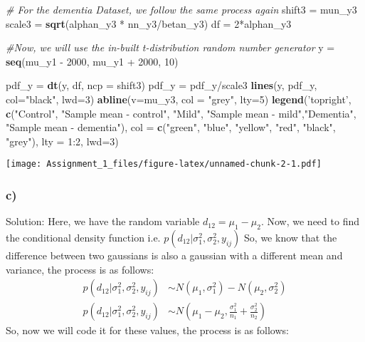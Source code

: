 \documentclass[]{article}
\newenvironment{Shaded}{\begin{snugshade}}{\end{snugshade}}
\newcommand{\KeywordTok}[1]{\textcolor[rgb]{0.13,0.29,0.53}{\textbf{{#1}}}}
\newcommand{\DataTypeTok}[1]{\textcolor[rgb]{0.13,0.29,0.53}{{#1}}}
\newcommand{\DecValTok}[1]{\textcolor[rgb]{0.00,0.00,0.81}{{#1}}}
\newcommand{\StringTok}[1]{\textcolor[rgb]{0.31,0.60,0.02}{{#1}}}
\newcommand{\CommentTok}[1]{\textcolor[rgb]{0.56,0.35,0.01}{\textit{{#1}}}}
\newcommand{\NormalTok}[1]{{#1}}
\begin{document}
\begin{Shaded}
\begin{Highlighting}[]
\CommentTok{# For the dementia Dataset, we follow the same process again}
\NormalTok{shift3 =}\StringTok{ }\NormalTok{mun_y3}
\NormalTok{scale3 =}\StringTok{ }\KeywordTok{sqrt}\NormalTok{(alphan_y3 *}\StringTok{ }\NormalTok{nn_y3/betan_y3)}
\NormalTok{df =}\StringTok{ }\DecValTok{2}\NormalTok{*alphan_y3}

\CommentTok{#Now, we will use the in-built t-distribution random number generator}
\NormalTok{y =}\StringTok{ }\KeywordTok{seq}\NormalTok{(mu_y1 -}\StringTok{ }\DecValTok{2000}\NormalTok{, mu_y1 +}\StringTok{ }\DecValTok{2000}\NormalTok{, }\DecValTok{10}\NormalTok{)}

\NormalTok{pdf_y =}\StringTok{ }\KeywordTok{dt}\NormalTok{(y, df, }\DataTypeTok{ncp =} \NormalTok{shift3)}
\NormalTok{pdf_y =}\StringTok{ }\NormalTok{pdf_y/scale3}
\KeywordTok{lines}\NormalTok{(y, pdf_y, }\DataTypeTok{col=}\StringTok{"black"}\NormalTok{, }\DataTypeTok{lwd=}\DecValTok{3}\NormalTok{)}
\KeywordTok{abline}\NormalTok{(}\DataTypeTok{v=}\NormalTok{mu_y3, }\DataTypeTok{col =} \StringTok{"grey"}\NormalTok{, }\DataTypeTok{lty=}\DecValTok{5}\NormalTok{)}
\KeywordTok{legend}\NormalTok{(}\StringTok{'topright'}\NormalTok{, }\KeywordTok{c}\NormalTok{(}\StringTok{"Control"}\NormalTok{, }\StringTok{"Sample mean - control"}\NormalTok{, }\StringTok{"Mild"}\NormalTok{, }\StringTok{"Sample mean - mild"}\NormalTok{,}\StringTok{"Dementia"}\NormalTok{, }\StringTok{"Sample mean - dementia"}\NormalTok{), }\DataTypeTok{col =} \KeywordTok{c}\NormalTok{(}\StringTok{"green"}\NormalTok{, }\StringTok{"blue"}\NormalTok{, }\StringTok{"yellow"}\NormalTok{, }\StringTok{"red"}\NormalTok{, }\StringTok{"black"}\NormalTok{, }\StringTok{"grey"}\NormalTok{), }\DataTypeTok{lty =} \DecValTok{1}\NormalTok{:}\DecValTok{2}\NormalTok{, }\DataTypeTok{lwd=}\DecValTok{3}\NormalTok{)}
\end{Highlighting}
\end{Shaded}

\texttt{[image: Assignment\_1\_files/figure-latex/unnamed-chunk-2-1.pdf]}

\subsubsection{c)}\label{c}

Solution: Here, we have the random variable \(d_{12} = \mu_1 - \mu_2\).
Now, we need to find the conditional density function i.e.
\(p(d_{12}| \sigma_1^2, \sigma_2^2, y_{ij})\) So, we know that the
difference between two gaussians is also a gaussian with a different
mean and variance, the process is as follows: \[
\begin{align*}
p(d_{12}| \sigma_1^2, \sigma_2^2, y_{ij}) &\sim N(\mu_1,\sigma_1^2) - N(\mu_2,\sigma_2^2) \\
p(d_{12}| \sigma_1^2, \sigma_2^2, y_{ij}) &\sim N(\mu_1 - \mu_2, \frac{\sigma_1^2}{n_1} + \frac{\sigma_2^2}{n_2})
\end{align*}
\] So, now we will code it for these values, the process is as follows:
\end{document}
